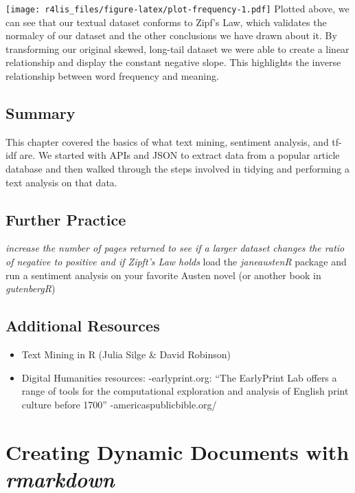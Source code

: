 \documentclass[
  krantz2]{krantz}
\providecommand{\tightlist}{%
  \setlength{\itemsep}{0pt}\setlength{\parskip}{0pt}}
\begin{document}
\texttt{[image: r4lis\_files/figure-latex/plot-frequency-1.pdf]}
Plotted above, we can see that our textual dataset conforms to Zipf's Law, which validates the normalcy of our dataset and the other conclusions we have drawn about it. By transforming our original skewed, long-tail dataset we were able to create a linear relationship and display the constant negative slope. This highlights the inverse relationship between word frequency and meaning.

\hypertarget{text-summary}{%
\section{Summary}\label{text-summary}}

This chapter covered the basics of what text mining, sentiment analysis, and tf-idf are. We started with APIs and JSON to extract data from a popular article database and then walked through the steps involved in tidying and performing a text analysis on that data.

\hypertarget{text-study}{%
\section{Further Practice}\label{text-study}}

\emph{increase the number of pages returned to see if a larger dataset changes the ratio of negative to positive and if Zipft's Law holds
} load the \emph{janeaustenR} package and run a sentiment analysis on your favorite Austen novel (or another book in \emph{gutenbergR})

\hypertarget{text-resources}{%
\section{Additional Resources}\label{text-resources}}

\begin{itemize}
\tightlist
\item
  Text Mining in R (Julia Silge \& David Robinson)
\item
  Digital Humanities resources:
  -earlyprint.org: ``The EarlyPrint Lab offers a range of tools for the computational exploration and analysis of English print culture before 1700''
  -americaspublicbible.org/
\end{itemize}

\hypertarget{rmarkdown}{%
\chapter{\texorpdfstring{Creating Dynamic Documents with \emph{rmarkdown}}{Creating Dynamic Documents with rmarkdown}}\label{rmarkdown}}
\end{document}

